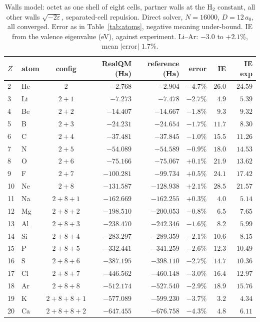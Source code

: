 \begin{table}[!htbp]
\centering
\small
\renewcommand{\arraystretch}{1.08}
\caption{Walls model: octet as one shell of eight cells, partner walls at the H$_2$ constant, all other walls
$\sqrt{-2\varepsilon}$, separated-cell repulsion. Direct solver, $N=16000$, $D=12\,a_0$, all converged. Error
as in Table~\ref{tab:atoms}, negative meaning under-bound. IE from the valence eigenvalue (eV), against
experiment. Li--Ar: $-3.0$ to $+2.1\%$, mean $|\text{error}|$ $1.7\%$.}\label{tab:walls-atoms}
\begin{tabular}{llcrrrrr}
\toprule
$Z$ & atom & config & RealQM (Ha) & reference (Ha) & error & IE & IE exp \\
\midrule
2 & He & $2$ & $-2.768$ & $-2.904$ & $-4.7\%$ & $26.0$ & $24.59$ \\
3 & Li & $2{+}1$ & $-7.273$ & $-7.478$ & $-2.7\%$ & $4.9$ & $5.39$ \\
4 & Be & $2{+}2$ & $-14.407$ & $-14.667$ & $-1.8\%$ & $9.3$ & $9.32$ \\
5 & B & $2{+}3$ & $-24.231$ & $-24.654$ & $-1.7\%$ & $11.7$ & $8.30$ \\
6 & C & $2{+}4$ & $-37.481$ & $-37.845$ & $-1.0\%$ & $15.5$ & $11.26$ \\
7 & N & $2{+}5$ & $-54.089$ & $-54.589$ & $-0.9\%$ & $18.0$ & $14.53$ \\
8 & O & $2{+}6$ & $-75.166$ & $-75.067$ & $+0.1\%$ & $21.9$ & $13.62$ \\
9 & F & $2{+}7$ & $-100.281$ & $-99.734$ & $+0.5\%$ & $24.1$ & $17.42$ \\
10 & Ne & $2{+}8$ & $-131.587$ & $-128.938$ & $+2.1\%$ & $28.5$ & $21.57$ \\
11 & Na & $2{+}8{+}1$ & $-162.669$ & $-162.255$ & $+0.3\%$ & $4.0$ & $5.14$ \\
12 & Mg & $2{+}8{+}2$ & $-198.510$ & $-200.053$ & $-0.8\%$ & $6.5$ & $7.65$ \\
13 & Al & $2{+}8{+}3$ & $-238.470$ & $-242.346$ & $-1.6\%$ & $8.2$ & $5.99$ \\
14 & Si & $2{+}8{+}4$ & $-283.297$ & $-289.359$ & $-2.1\%$ & $10.6$ & $8.15$ \\
15 & P & $2{+}8{+}5$ & $-332.441$ & $-341.259$ & $-2.6\%$ & $12.3$ & $10.49$ \\
16 & S & $2{+}8{+}6$ & $-387.195$ & $-398.110$ & $-2.7\%$ & $14.7$ & $10.36$ \\
17 & Cl & $2{+}8{+}7$ & $-446.562$ & $-460.148$ & $-3.0\%$ & $16.4$ & $12.97$ \\
18 & Ar & $2{+}8{+}8$ & $-512.174$ & $-527.540$ & $-2.9\%$ & $18.9$ & $15.76$ \\
19 & K & $2{+}8{+}8{+}1$ & $-577.089$ & $-599.230$ & $-3.7\%$ & $3.2$ & $4.34$ \\
20 & Ca & $2{+}8{+}8{+}2$ & $-647.455$ & $-676.758$ & $-4.3\%$ & $4.8$ & $6.11$ \\
\bottomrule
\end{tabular}
\end{table}

